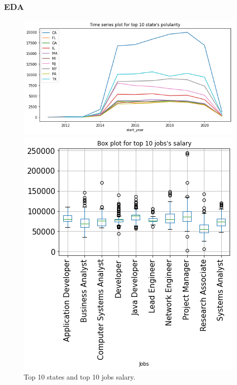 \documentclass[10pt,mathserif]{beamer}
\begin{document}
	\begin{frame}
	\frametitle{EDA}
	\begin{figure}[h]
		
		\centering
		\begin{minipage}{.48\linewidth}
			\includegraphics[width=\linewidth]{./photos/top10state_timeseries.png}
			
			
		\end{minipage}
		\hfill
		\begin{minipage}{.48\linewidth}
			\includegraphics[width=.7\linewidth]{./photos/top10jobs.png}
			
			
		\end{minipage}
		\caption{Top 10 states and top 10 jobs salary.}

	\end{figure}
\end{frame}

	
\end{document}
